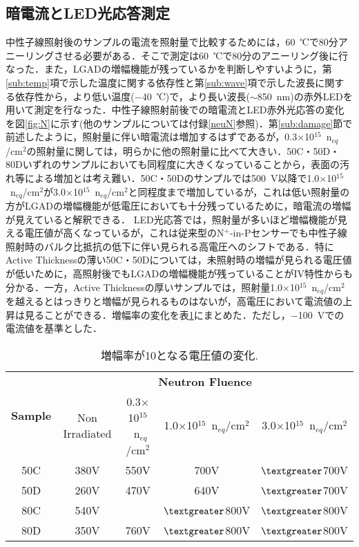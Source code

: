 \subsection{暗電流とLED光応答測定}
中性子線照射後のサンプルの電流を照射量で比較するためには，60~℃で80分アニーリングさせる必要がある\cite{moll}．そこで測定は60~℃で80分のアニーリング後に行なった．また，LGADの増幅機能が残っているかを判断しやすいように，第\ref{sub:temp}項で示した温度に関する依存性と第\ref{sub:wave}項で示した波長に関する依存性から，より低い温度($-$40~℃)で，より長い波長($\sim$850~nm)の赤外LEDを用いて測定を行なった．中性子線照射前後での暗電流とLED赤外光応答の変化を図\ref{fig:N}に示す(他のサンプルについては付録\ref{neuN}参照)．第\ref{sub:damage}節で前述したように，照射量に伴い暗電流は増加するはずであるが，0.3$\times$10$^{15}$~n$_{eq}$/cm$^{2}$の照射量に関しては，明らかに他の照射量に比べて大きい．50C・50D・80Dいずれのサンプルにおいても同程度に大きくなっていることから，表面の汚れ等による増加とは考え難い．50C・50Dのサンプルでは500~V以降で1.0$\times$10$^{15}$~n$_{eq}$/cm$^{2}$が3.0$\times$10$^{15}$~n$_{eq}$/cm$^{2}$と同程度まで増加しているが，これは低い照射量の方がLGADの増幅機能が低電圧においても十分残っているために，暗電流の増幅が見えていると解釈できる．
LED光応答では，照射量が多いほど増幅機能が見える電圧値が高くなっているが，これは従来型のN$^{+}$-in-Pセンサーでも中性子線照射時のバルク比抵抗の低下に伴い見られる高電圧へのシフトである．特にActive Thicknessの薄い50C・50Dについては，未照射時の増幅が見られる電圧値が低いために，高照射後でもLGADの増幅機能が残っていることがIV特性からも分かる．一方，Active Thicknessの厚いサンプルでは，照射量1.0$\times$10$^{15}$~n$_{eq}$/cm$^{2}$を越えるとはっきりと増幅が見られるものはないが，高電圧において電流値の上昇は見ることができる．増幅率の変化を表\ref{tab:gain}にまとめた．ただし，$-$100~Vでの電流値を基準とした．\par
\begin{table}[H]
	\centering
	\caption{増幅率が10となる電圧値の変化.}
	\vspace{5truemm}
	\begin{tabular}{|c||c|c|c|c|}\hline
	\multirow{2}{*}{\textbf{Sample}}& \multicolumn{4}{|c|}{\textbf{Neutron Fluence}}\\ \cline{2-5}
	&Non Irradiated &0.3$\times$10$^{15}$~n$_{eq}$/cm$^{2}$ &1.0$\times$10$^{15}$~n$_{eq}$/cm$^{2}$ &3.0$\times$10$^{15}$~n$_{eq}$/cm$^{2}$\\ \cline{2-5}
	\hline\hline
	50C& 380V& 550V& 700V& $\textgreater$700V\\
	\hline
	50D& 260V& 470V& 640V& $\textgreater$700V\\
	\hline
	80C& 540V& & $\textgreater$800V& $\textgreater$800V\\
	\hline
	80D& 350V& 760V& $\textgreater$800V& $\textgreater$800V\\
	\hline
	\end{tabular}
	\label{tab:gain}
\end{table}
